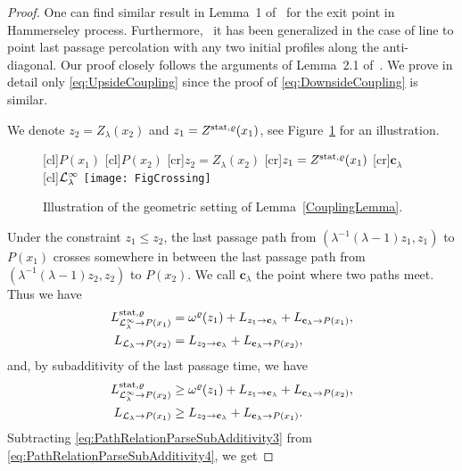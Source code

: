 \documentclass[12pt,a4paper]{article}
\numberwithin{equation}{section}
\begin{document}
\begin{proof}
One can find similar result in Lemma~1 of~\cite{CP15b} for the exit point in Hammerseley process. Furthermore,~\cite{Pi17} it has been generalized in the case of line to point last passage percolation with any two initial profiles along the anti-diagonal. Our proof closely follows the arguments of Lemma~2.1 of~\cite{Pi17}. We prove in detail only \eqref{eq:UpsideCoupling} since the proof of \eqref{eq:DownsideCoupling} is similar.

We denote $z_2= Z_\lambda(x_2)$ and $z_1=Z^{{\rm stat},\varrho}(x_1)$, see Figure~\ref{FigCrossing} for an illustration.
%
\begin{figure}
\begin{center}
[cl]{$P(x_1)$}
[cl]{$P(x_2)$}
[cr]{$z_2=Z_\lambda(x_2)$}
[cr]{$z_1=Z^{{\rm stat},\varrho}(x_1)$}
[cr]{$\mathbf{c}_\lambda$}
[cl]{${\cal L}_\lambda^\infty$}
\texttt{[image: FigCrossing]}
\caption{Illustration of the geometric setting of Lemma~\ref{CouplingLemma}.}
\label{FigCrossing}
\end{center}
\end{figure}
%
Under the constraint $z_1\leq z_2$, the last passage path from $\left(\lambda^{-1}(\lambda-1)z_1,z_1\right)$ to $P(x_1)$ crosses somewhere in between the
last passage path from $(\lambda^{-1}(\lambda-1)z_2,z_2)$ to $P(x_2)$. We call $\mathbf{c}_{\lambda}$ the point where two paths meet.
Thus we have
\begin{align}
L^{{\rm stat},\varrho}_{{\cal L}_{\lambda}^\infty\to P(x_1)}&= \omega^{\varrho}(z_1)+L_{z_1\to \mathbf{c}_{\lambda}} +L_{\mathbf{c}_{\lambda}\to P(x_1)},\label{eq:PathRelationParseSubAdditivity1}\\
L_{{\cal L}_{\lambda}\to P(x_2)} &= L_{z_2\to \mathbf{c}_{\lambda}}+ L_{\mathbf{c}_{\lambda}\to P(x_2)},\label{eq:PathRelationParseSubAdditivity4}
\end{align}
and, by subadditivity of the last passage time, we have
\begin{align}
L^{{\rm stat},\varrho}_{{\cal L}_{\lambda}^\infty\to P(x_2)} &\geq \omega^{\varrho}(z_1)+L_{z_1\to \mathbf{c}_{\lambda}}+ L_{\mathbf{c}_{\lambda}\to P(x_2)},\label{eq:PathRelationParseSubAdditivity2}\\
L_{{\cal L}_{\lambda}\to P(x_1)}&\geq L_{z_2\to \mathbf{c}_{\lambda}} +L_{\mathbf{c}_{\lambda}\to P(x_1)}.\label{eq:PathRelationParseSubAdditivity3}
\end{align}
Subtracting \eqref{eq:PathRelationParseSubAdditivity3} from \eqref{eq:PathRelationParseSubAdditivity4}, we get

\end{proof}
\end{document}
